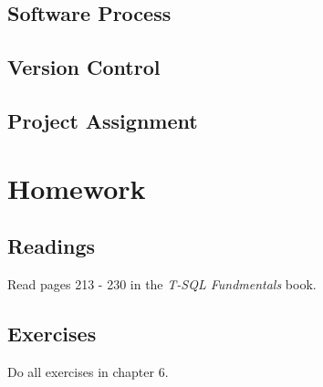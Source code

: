 \documentclass{article}
\begin{document}
        \subsection{Software Process}

        
        \subsection{Version Control}


        \subsection{Project Assignment}

    \section{Homework}


        \subsection{Readings}

        Read pages 213 - 230 in the \textit{T-SQL Fundmentals} book.
        
        \subsection{Exercises}

        Do all exercises in chapter 6.
\end{document}
